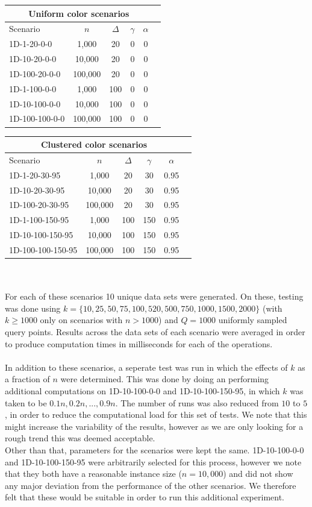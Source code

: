 \documentclass{article}
\begin{document}
\hskip-2.3cm
\begin{tabular}{|l||c|c|c|c|c|}
 \hline
 \multicolumn{5}{|c|}{Uniform color scenarios} \\
 \hline
 Scenario & $n$ & $\Delta$ & $\gamma$ & $\alpha$\\
 \hline
 1D-1-20-0-0 & 1,000 & 20 & 0 & 0 \\
 1D-10-20-0-0 & 10,000 & 20 & 0 & 0 \\
 1D-100-20-0-0 & 100,000 & 20 & 0 & 0 \\
 1D-1-100-0-0 & 1,000 & 100 & 0 & 0 \\
 1D-10-100-0-0 & 10,000 & 100 & 0 & 0 \\
 1D-100-100-0-0 & 100,000 & 100 & 0 & 0 \\
 \hline
\end{tabular}
\:\:
\begin{tabular}{|l||c|c|c|c|c|}
 \hline
 \multicolumn{5}{|c|}{Clustered color scenarios} \\
 \hline
 Scenario & $n$ & $\Delta$ & $\gamma$ & $\alpha$\\
 \hline
 1D-1-20-30-95 & 1,000 & 20 & 30 & 0.95 \\
 1D-10-20-30-95 & 10,000 & 20 & 30 & 0.95 \\
 1D-100-20-30-95 & 100,000 & 20 & 30 & 0.95 \\
 1D-1-100-150-95 & 1,000 & 100 & 150 & 0.95 \\
 1D-10-100-150-95 & 10,000 & 100 & 150 & 0.95 \\
 1D-100-100-150-95 & 100,000 & 100 & 150 & 0.95 \\
 \hline
\end{tabular}\\\\
For each of these scenarios 10 unique data sets were generated. On these, testing was done using $k=\{10, 25, 50, 75, 100, 520, 500, 750, 1000, 1500, 2000\}$ (with $k\geq1000$ only on scenarios with $n > 1000$) and $Q=1000$ uniformly sampled query points. Results across the data sets of each scenario were averaged in order to produce computation times in milliseconds for each of the operations. \\\\
In addition to these scenarios, a seperate test was run in which the effects of $k$ as a fraction of $n$ were determined. This was done by doing an performing additional computations on 1D-10-100-0-0 and 1D-10-100-150-95, in which $k$ was taken to be $0.1n, 0.2n, ..., 0.9n$. The number of runs was also reduced from $10$ to $5$, in order to reduce the computational load for this set of tests. We note that this might increase the variability of the results, however as we are only looking for a rough trend this was deemed acceptable.\\ Other than that, parameters for the scenarios were kept the same. 1D-10-100-0-0 and 1D-10-100-150-95 were arbitrarily selected for this process, however we note that they both have a reasonable instance size ($n=10,000$) and did not show any major deviation from the performance of the other scenarios. We therefore felt that these would be suitable in order to run this additional experiment. \\
\end{document}
